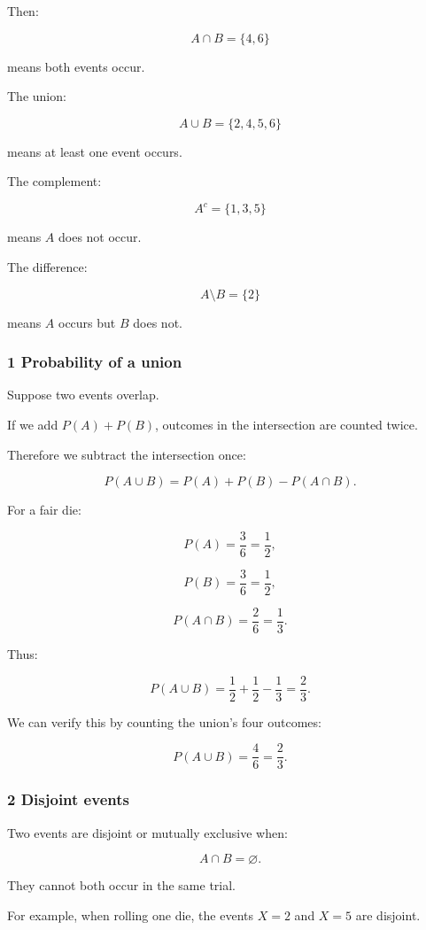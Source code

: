Then:

\[
 A\cap B=\{4,6\}
\]

means both events occur.

The union:

\[
 A\cup B=\{2,4,5,6\}
\]

means at least one event occurs.

The complement:

\[
 A^c=\{1,3,5\}
\]

means \(A\) does not occur.

The difference:

\[
 A\setminus B=\{2\}
\]

means \(A\) occurs but \(B\) does not.

\subsubsection{1 Probability of a union}\label{02-foundations-ii-ch023-probability-of-a-union}

Suppose two events overlap.

If we add \(P(A)+P(B)\), outcomes in the intersection are counted twice.

Therefore we subtract the intersection once:

\[
 \boxed{ P(A\cup B) = P(A)+P(B)-P(A\cap B) }.
\]

For a fair die:

\[
 P(A)=\frac36=\frac12,
\]

\[
 P(B)=\frac36=\frac12,
\]

\[
 P(A\cap B)=\frac26=\frac13.
\]

Thus:

\[
 P(A\cup B) = \frac12+\frac12-\frac13 =\boxed{\frac23}.
\]

We can verify this by counting the union's four outcomes:

\[
 P(A\cup B)=\frac46=\frac23.
\]

\subsubsection{2 Disjoint events}\label{02-foundations-ii-ch023-disjoint-events}

Two events are disjoint or mutually exclusive when:

\[
 A\cap B=\varnothing.
\]

They cannot both occur in the same trial.

For example, when rolling one die, the events \(X=2\) and \(X=5\) are disjoint.

